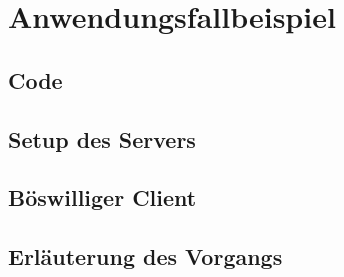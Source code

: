 \section{Anwendungsfallbeispiel}
\subsection{Code}
\subsection{Setup des Servers}
\subsection{Böswilliger Client}
\subsection{Erläuterung des Vorgangs} \label{explainersub}